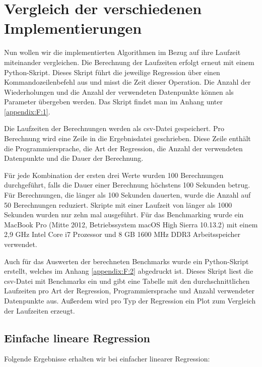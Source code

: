 \chapter{Vergleich der verschiedenen Implementierungen}
\label{chapter:4}

Nun wollen wir die implementierten Algorithmen im Bezug auf ihre Laufzeit miteinander vergleichen. Die Berechnung der Laufzeiten erfolgt erneut mit einem Python-Skript. Dieses Skript führt die jeweilige Regression über einen Kommandozeilenbefehl aus und misst die Zeit dieser Operation. Die Anzahl der Wiederholungen und die Anzahl der verwendeten Datenpunkte können als Parameter übergeben werden. Das Skript findet man im Anhang unter \ref{appendix:F:1}.

Die Laufzeiten der Berechnungen werden als csv-Datei gespeichert. Pro Berechnung wird eine Zeile in die Ergebnisdatei geschrieben. Diese Zeile enthält die Programmiersprache, die Art der Regression, die Anzahl der verwendeten Datenpunkte und die Dauer der Berechnung.

Für jede Kombination der ersten drei Werte wurden 100 Berechnungen durchgeführt, falls die Dauer einer Berechnung höchstens 100 Sekunden betrug. Für Berechnungen, die länger als 100 Sekunden dauerten, wurde die Anzahl auf 50 Berechnungen reduziert. Skripte mit einer Laufzeit von länger als 1000 Sekunden wurden nur zehn mal ausgeführt. Für das Benchmarking wurde ein MacBook Pro (Mitte 2012, Betriebssystem macOS High Sierra 10.13.2) mit einem 2,9 GHz Intel Core i7 Prozessor und 8 GB 1600 MHz DDR3 Arbeitsspeicher verwendet.

Auch für das Auswerten der berechneten Benchmarks wurde ein Python-Skript erstellt, welches im Anhang \ref{appendix:F:2} abgedruckt ist. Dieses Skript liest die csv-Datei mit Benchmarks ein und gibt eine Tabelle mit den durchschnittlichen Laufzeiten pro Art der Regression, Programmiersprache und Anzahl verwendeter Datenpunkte aus. Außerdem wird pro Typ der Regression ein Plot zum Vergleich der Laufzeiten erzeugt.

\section{Einfache lineare Regression}
\label{section:4:1}

Folgende Ergebnisse erhalten wir bei einfacher linearer Regression:

